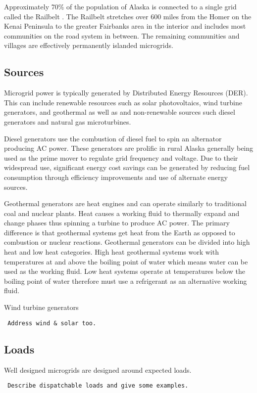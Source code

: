 Approximately 70\% of the population of Alaska is connected to a single grid called the Railbelt \cite{railbelt}. The Railbelt stretches over 600 miles from the Homer on the Kenai Peninsula to the greater Fairbanks area in the interior and includes most communities on the road system in between. The remaining communities and villages are effectively permanently islanded microgrids. 

\subsection{Sources}
Microgrid power is typically generated by Distributed Energy Resources (DER). This can include renewable resources such as solar photovoltaics, wind turbine generators, and geothermal as well as and non-renewable sources such diesel generators and natural gas microturbines. 

Diesel generators use the combustion of diesel fuel to spin an alternator producing AC power. These generators are prolific in rural Alaska generally being used as the prime mover to regulate grid frequency and voltage. 
Due to their widespread use, significant energy cost savings can be generated by reducing fuel consumption through efficiency improvements and use of alternate energy sources.

Geothermal generators are heat engines and can operate similarly to traditional coal and nuclear plants. Heat causes a working fluid to thermally expand and change phases thus spinning a turbine to produce AC power. The primary difference is that geothermal systems get heat from the Earth as opposed to combustion or nuclear reactions. Geothermal generators can be divided into high heat and low heat categories. High heat geothermal systems work with temperatures at and above the boiling point of water which means water can be used as the working fluid. Low heat systems operate at temperatures below the boiling point of water therefore must use a refrigerant as an alternative working fluid. 

Wind turbine generators 
\begin{verbatim} 
 Address wind & solar too.
\end{verbatim}

\subsection{Loads}
Well designed microgrids are designed around expected loads. 
\begin{verbatim} 
 Describe dispatchable loads and give some examples. 
\end{verbatim}

